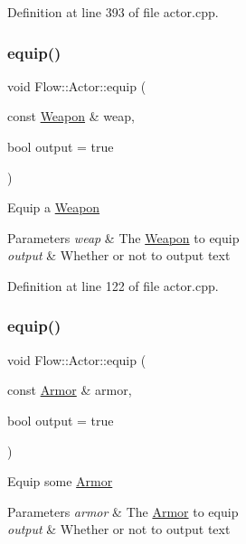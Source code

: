 Definition at line 393 of file actor.\+cpp.

\hypertarget{class_flow_1_1_actor_a2b2c31fc34e8aae951764f80730479e0}{}\label{class_flow_1_1_actor_a2b2c31fc34e8aae951764f80730479e0} 
\subsubsection{\texorpdfstring{equip()}{equip()}\hspace{0.1cm}{\footnotesize\ttfamily [1/2]}}
{\footnotesize\ttfamily void Flow\+::\+Actor\+::equip (\begin{DoxyParamCaption}\item[{const \hyperlink{class_flow_1_1_weapon}{Weapon} \&}]{weap,  }\item[{bool}]{output = {\ttfamily true} }\end{DoxyParamCaption})}

Equip a \hyperlink{class_flow_1_1_weapon}{Weapon} 
\begin{DoxyParams}{Parameters}
{\em weap} & The \hyperlink{class_flow_1_1_weapon}{Weapon} to equip \\
\hline
{\em output} & Whether or not to output text \\
\hline
\end{DoxyParams}


Definition at line 122 of file actor.\+cpp.

\hypertarget{class_flow_1_1_actor_aa3e3371f1fde52c0dae09ba6f34bb599}{}\label{class_flow_1_1_actor_aa3e3371f1fde52c0dae09ba6f34bb599} 
\subsubsection{\texorpdfstring{equip()}{equip()}\hspace{0.1cm}{\footnotesize\ttfamily [2/2]}}
{\footnotesize\ttfamily void Flow\+::\+Actor\+::equip (\begin{DoxyParamCaption}\item[{const \hyperlink{class_flow_1_1_armor}{Armor} \&}]{armor,  }\item[{bool}]{output = {\ttfamily true} }\end{DoxyParamCaption})}

Equip some \hyperlink{class_flow_1_1_armor}{Armor} 
\begin{DoxyParams}{Parameters}
{\em armor} & The \hyperlink{class_flow_1_1_armor}{Armor} to equip \\
\hline
{\em output} & Whether or not to output text \\
\hline
\end{DoxyParams}


